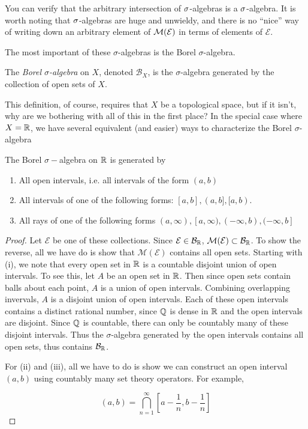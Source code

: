 \documentclass[main.tex]{subfiles}
\begin{document}
You can verify that the arbitrary intersection of ${\sigma}$-algebras is a ${\sigma}$-algebra. It is worth noting that ${\sigma}$-algebras are huge and unwieldy, and there is no ``nice'' way of writing down an arbitrary element of ${\mathcal M}(\mathcal{E})$ in terms of elements of $\mathcal{E}$. 

The most important of these $\sigma$-algebras is the Borel $\sigma$-algebra.

\begin{definition}
The \emph{Borel $\sigma$-algebra} on $X$, denoted $\mathcal{B}_X$, is the $\sigma$-algebra generated by the collection of open sets of $X$.
\end{definition}

This definition, of course, requires that $X$ be a topological space, but if it isn't, why are we bothering with all of this in the first place? In the special case where $X = {\mathbb R}$, we have several equivalent (and easier) ways to characterize the Borel $\sigma$-algebra

\begin{proposition}The Borel $\sigma-$algebra on ${\mathbb R}$ is generated by 
\begin{enumerate}
	\item All open intervals, i.e. all intervals of the form $(a, b)$
	\item All intervals of one of the following forms: $[a, b], (a, b], [a, b)$.
	\item All rays of one of the following forms $(a, \infty), [a, \infty), (-\infty, b), (-\infty, b]$
\end{enumerate}
\begin{proof}
Let $\mathcal{E}$ be one of these collections. Since $\mathcal{E} \in \mathcal{B}_{\mathbb R}$, $\mathcal{M}(\mathcal{E}) \subset \mathcal{B}_{\mathbb R}$. To show the reverse, all we have do is show that $\mathcal{M}(\mathcal{E})$ contains all open sets. Starting with (i), we note that every open set in ${\mathbb R}$ is a countable disjoint union of open intervals. To see this, let $A$ be an open set in ${\mathbb R}$. Then since open sets contain balls about each point, $A$ is a union of open intervals. Combining overlapping invervals, $A$ is a disjoint union of open intervals. Each of these open intervals contains a distinct rational number, since $\mathbb{Q}$ is dense in ${\mathbb R}$ and the open intervals are disjoint. Since $\mathbb{Q}$ is countable, there can only be countably many of these disjoint intervals. Thus the $\sigma$-algebra generated by the open intervals contains all open sets, thus contains $\mathcal{B}_{\mathbb R}$.

For (ii) and (iii), all we have to do is show we can construct an open interval $(a, b)$ using countably many set theory operators. For example,

\[
(a, b) = \bigcap_{n=1}^\infty \left[ a - \frac{1}{n}, b - \frac{1}{n}  \right]
\]

\end{proof}
\end{proposition}
\end{document}
